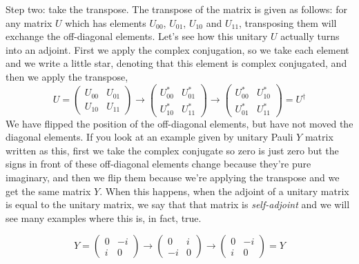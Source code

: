 Step two: take the transpose. The transpose of the matrix is given as follows: for any matrix $U$ which has elements $U_{00}$, $U_{01}$, $U_{10}$ and $U_{11}$, transposing them will exchange the off-diagonal elements. Let's see how this unitary $U$ actually turns into an adjoint. First we apply the complex conjugation, so we take each element and we write a little star, denoting that this element is complex conjugated, and then we apply the transpose,
\begin{equation}
U=\left(\begin{array}{ll}
U_{00} & U_{01} \\
U_{10} & U_{11}
\end{array}\right) \rightarrow\left(\begin{array}{cc}
U_{00}^{*} & U_{01}^{*} \\
U_{10}^{*} & U_{11}^{*}
\end{array}\right) \longrightarrow\left(\begin{array}{ll}
U_{00}^{*} & U_{10}^{*} \\
U_{01}^{*} & U_{11}^{*}
\end{array}\right)=U^{\dagger}
\end{equation}
We have flipped the position of the off-diagonal elements, but have not moved the diagonal elements. If you look at an example given by unitary Pauli $Y$ matrix written as this, first we take the complex conjugate so zero is just zero but the signs in front of these off-diagonal elements change because they're pure imaginary, and then we flip them because we're applying the transpose and we get the same matrix $Y$. When this happens, when the adjoint of a unitary matrix is equal to the unitary matrix, we say that that matrix is \emph{self-adjoint} and we will see many examples where this is, in fact, true.

\begin{equation}
Y=\left(\begin{array}{cc}
0 & -i \\
i & 0
\end{array}\right) \longrightarrow\left(\begin{array}{cc}
0 & i \\
-i & 0
\end{array}\right) \longrightarrow\left(\begin{array}{cc}
0 & -i \\
i & 0
\end{array}\right)=Y
\end{equation}

